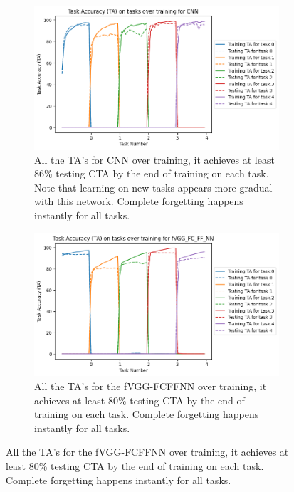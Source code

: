 \begin{figure}[ht]
    \centering
    \begin{subfigure}[t]{0.4\textwidth}
       \includegraphics[width=\linewidth]{images/CIFAR10_CL/CNN_TA_task.png}
       \caption{All the TA's for CNN over training, it achieves at least 86\% testing CTA by the end of training on each task. Note that learning on new tasks appears more gradual with this network. Complete forgetting happens instantly for all tasks.}
    \end{subfigure}
    \quad %
    \begin{subfigure}[t]{0.4\textwidth}
       \includegraphics[width=\linewidth]{images/CIFAR10_CL/fVGG_FC_FF_NN_TA_task.png}
       \caption{All the TA's for the fVGG-FCFFNN over training, it achieves at least 80\% testing CTA by the end of training on each task. Complete forgetting happens instantly for all tasks.}
    \end{subfigure}
    
    \medskip %
    

\end{figure}
